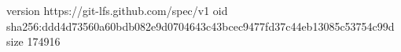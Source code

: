 version https://git-lfs.github.com/spec/v1
oid sha256:ddd4d73560a60bdb082e9d0704643c43bcec9477fd37c44eb13085c53754c99d
size 174916

